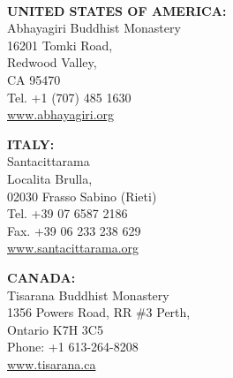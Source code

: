 {\begin{minipage}{0.95\linewidth}
\begin{multicols}{2}
{}

\end{multicols}
\end{minipage}

\clearpage
\thispagestyle{empty}

{\chapterTitleSize\mbox{}}

\mbox{}

\mbox{} \\
\mbox{}
\vspace*{\baselineskip}

\begin{minipage}{0.95\linewidth}
\begin{multicols}{2}
\setlength{\parindent}{0pt}
\setlength{\parskip}{1.2em}
\small

{\raggedright

\textbf{UNITED STATES OF AMERICA:} \\
Abhayagiri Buddhist Monastery\\
16201 Tomki Road,\\
Redwood Valley,\\
CA 95470\\
Tel. +1 (707) 485 1630\\
\href{http://www.abhayagiri.org}{www.abhayagiri.org}

\textbf{ITALY:} \\
Santacittarama\\
Localita Brulla,\\
02030 Frasso Sabino (Rieti)\\
Tel. +39 07 6587 2186\\
Fax. +39 06 233 238 629\\
\href{http://www.santacittarama.org}{www.santacittarama.org}

}

\columnbreak

{\raggedright

\textbf{CANADA:} \\
Tisarana Buddhist Monastery\\
1356 Powers Road, RR \#3 Perth,\\
Ontario K7H 3C5\\
Phone: +1 613-264-8208\\
\href{http://www.tisarana.ca}{www.tisarana.ca}


}

\end{multicols}
\end{minipage}

}

